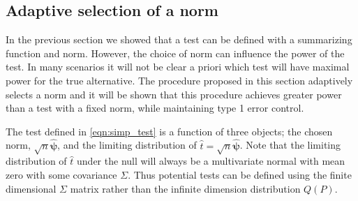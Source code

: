 \documentclass{article}
\begin{document}


\subsection{Adaptive selection of a norm}
In the previous section we showed that a test can be defined with a summarizing function and norm. However, the choice of norm can influence the power of the test. In many scenarios it will not be clear a priori which test will have maximal power for the true alternative. The procedure proposed in this section adaptively selects a norm and it will be shown that this procedure achieves greater power than a test with a fixed norm, while maintaining type 1 error control.  

The test defined in \eqref{eqn:simp_test} is a function of three objects; the chosen norm, $\sqrt{n}\hat{\boldsymbol{\psi}}$, and the limiting distribution of  $\hat{t} = \sqrt{n}\hat{\boldsymbol{\psi}}$. Note that the limiting distribution of $\hat{t}$ under the null will always be a multivariate normal with mean zero with some covariance $\Sigma$. Thus potential tests can be defined using the finite dimensional $\Sigma$ matrix rather than the infinite dimension distribution $Q(P)$.
\end{document}

